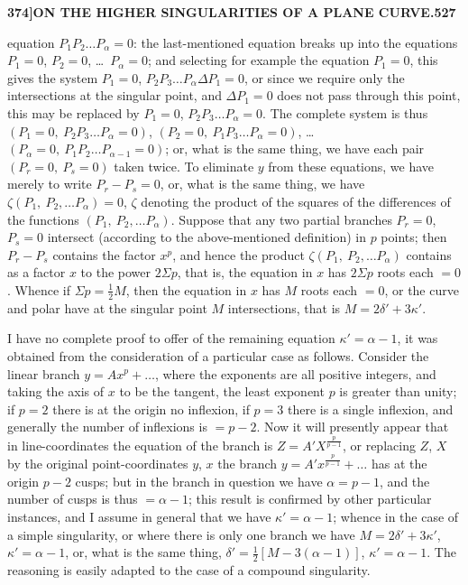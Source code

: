 \documentclass[11pt,a4paper]{article}
\begin{document}
\newpage
\begin{flushright}
\textbf{374]\hspace{1em}ON THE HIGHER SINGULARITIES OF A PLANE CURVE.\hfill527}
\end{flushright}

\vspace{12pt}

\noindent
equation $P_{1}P_{2}\ldots P_{\alpha} = 0$: the last-mentioned equation breaks up into the equations $P_{1} = 0$, $P_{2} = 0$, \ldots\ $P_{\alpha} = 0$; and selecting for example the equation $P_{1} = 0$, this gives the system $P_{1} = 0$, $P_{2}P_{3}\ldots P_{\alpha}\Delta P_{1} = 0$, or since we require only the intersections at the singular point, and $\Delta P_{1} = 0$ does not pass through this point, this may be replaced by $P_{1} = 0$, $P_{2}P_{3}\ldots P_{\alpha} = 0$. The complete system is thus $(P_{1} = 0,\ P_{2}P_{3}\ldots P_{\alpha} = 0)$, $(P_{2} = 0,\ P_{1}P_{3}\ldots P_{\alpha} = 0)$, \ldots\ $(P_{\alpha} = 0,\ P_{1}P_{2}\ldots P_{\alpha-1} = 0)$; or, what is the same thing, we have each pair $(P_{r} = 0,\ P_{s} = 0)$ taken twice. To eliminate $y$ from these equations, we have merely to write $P_{r} - P_{s} = 0$, or, what is the same thing, we have $\zeta(P_{1},\ P_{2},\ldots P_{\alpha}) = 0$, $\zeta$ denoting the product of the squares of the differences of the functions $(P_{1},\ P_{2},\ldots P_{\alpha})$. Suppose that any two partial branches $P_{r} = 0$, $P_{s} = 0$ intersect (according to the above-mentioned definition) in $p$ points; then $P_{r} - P_{s}$ contains the factor $x^{p}$, and hence the product $\zeta(P_{1},\ P_{2},\ldots P_{\alpha})$ contains as a factor $x$ to the power $2\Sigma p$, that is, the equation in $x$ has $2\Sigma p$ roots each $= 0$. Whence if $\Sigma p = \tfrac{1}{2}M$, then the equation in $x$ has $M$ roots each $= 0$, or the curve and polar have at the singular point $M$ intersections, that is $M = 2\delta' + 3\kappa'$.

I have no complete proof to offer of the remaining equation $\kappa' = \alpha - 1$, it was obtained from the consideration of a particular case as follows. Consider the linear branch $y = Ax^{p} + \ldots$, where the exponents are all positive integers, and taking the axis of $x$ to be the tangent, the least exponent $p$ is greater than unity; if $p = 2$ there is at the origin no inflexion, if $p = 3$ there is a single inflexion, and generally the number of inflexions is $= p - 2$. Now it will presently appear that in line-coordinates the equation of the branch is $Z = A'X^{\frac{p}{p-1}}$, or replacing $Z$, $X$ by the original point-coordinates $y$, $x$ the branch $y = A'x^{\frac{p}{p-1}} + \ldots$ has at the origin $p - 2$ cusps; but in the branch in question we have $\alpha = p - 1$, and the number of cusps is thus $= \alpha - 1$; this result is confirmed by other particular instances, and I assume in general that we have $\kappa' = \alpha - 1$; whence in the case of a simple singularity, or where there is only one branch we have $M = 2\delta' + 3\kappa'$, $\kappa' = \alpha - 1$, or, what is the same thing, $\delta' = \tfrac{1}{2}[M - 3(\alpha - 1)]$, $\kappa' = \alpha - 1$. The reasoning is easily adapted to the case of a compound singularity.
\end{document}
